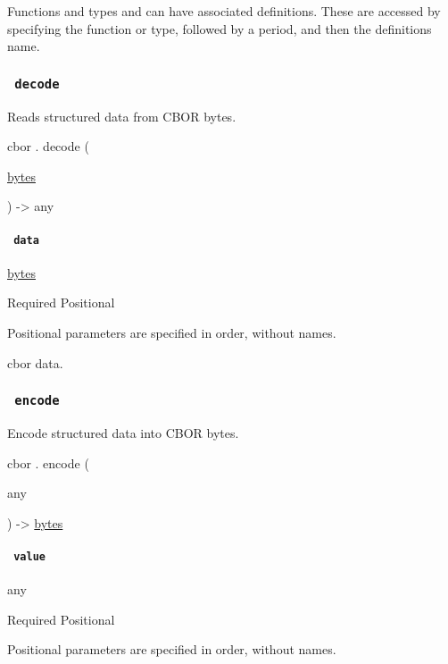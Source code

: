 \label{definitions-tooltip}
Functions and types and can have associated definitions. These are
accessed by specifying the function or type, followed by a period, and
then the definition\textquotesingle s name.

\subsubsection{\texorpdfstring{\texttt{\ decode\ }}{ decode }}\label{definitions-decode}

Reads structured data from CBOR bytes.

cbor { . } { decode } (

{ \href{/docs/reference/foundations/bytes/}{bytes} }

) -\textgreater{} { any }

\paragraph{\texorpdfstring{\texttt{\ data\ }}{ data }}\label{definitions-decode-data}

\href{/docs/reference/foundations/bytes/}{bytes}

{Required} {{ Positional }}

\label{definitions-decode-data-positional-tooltip}
Positional parameters are specified in order, without names.

cbor data.

\subsubsection{\texorpdfstring{\texttt{\ encode\ }}{ encode }}\label{definitions-encode}

Encode structured data into CBOR bytes.

cbor { . } { encode } (

{ { any } }

) -\textgreater{} \href{/docs/reference/foundations/bytes/}{bytes}

\paragraph{\texorpdfstring{\texttt{\ value\ }}{ value }}\label{definitions-encode-value}

{ any }

{Required} {{ Positional }}

\label{definitions-encode-value-positional-tooltip}
Positional parameters are specified in order, without names.

